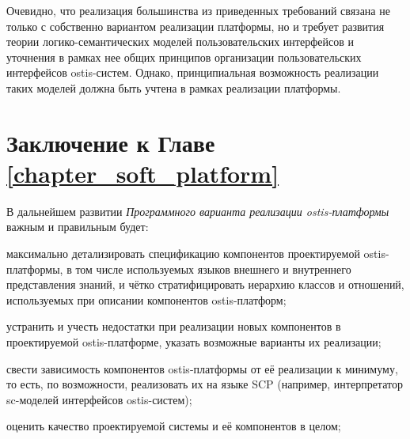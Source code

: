 Очевидно, что реализация большинства из приведенных требований связана не только с собственно вариантом реализации платформы, но и требует развития теории логико-семантических моделей пользовательских интерфейсов и уточнения в рамках нее общих принципов организации пользовательских интерфейсов ostis-систем. Однако, принципиальная возможность реализации таких моделей должна быть учтена в рамках реализации платформы.

\section*{Заключение к Главе \ref{chapter_soft_platform}~}
\label{sec_soft_platform_plans_and_tasks}

В дальнейшем развитии \textit{Программного варианта реализации ostis-платформы} важным и правильным будет:
\begin{textitemize}
    \item максимально детализировать спецификацию компонентов проектируемой ostis-платформы, в том числе используемых языков внешнего и внутреннего представления знаний, и чётко стратифицировать иерархию классов и отношений, используемых при описании компонентов ostis-платформ;
    \item устранить и учесть недостатки при реализации новых компонентов в проектируемой ostis-платформе, указать возможные варианты их реализации;
    \item свести зависимость компонентов ostis-платформы от её реализации к минимуму, то есть, по возможности, реализовать их на языке SCP (например, интерпретатор sc-моделей интерфейсов ostis-систем);
    \item оценить качество проектируемой системы и её компонентов в целом;
\end{textitemize}